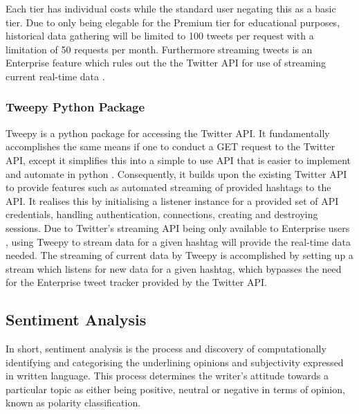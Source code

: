 \documentclass[oneside, 12pt]{article}
\begin{document}
			Each tier has individual costs while the standard user negating this as a basic tier. Due to only being elegable for the Premium tier for educational purposes, historical data gathering will be limited to 100 tweets per request with a limitation of 50 requests per month. Furthermore streaming tweets is an Enterprise feature which rules out the the Twitter API for use of streaming current real-time data \cite{ConStream}.
		
			\subsubsection{Tweepy Python Package}
			Tweepy is a python package for accessing the Twitter API. It fundamentally accomplishes the same means if one to conduct a GET request to the Twitter API, except it simplifies this into a simple to use API that is easier to implement and automate in python \cite{TweepyStream}. Consequently, it builds upon the existing Twitter API to provide features such as automated streaming of provided hashtags to the API. It realises this by initialising a listener instance for a provided set of API credentials, handling authentication, connections, creating and destroying sessions. Due to Twitter's streaming API being only available to Enterprise users \cite{SearchTweets}, using Tweepy to stream data for a given hashtag will provide the real-time data needed. The streaming of current data by Tweepy is accomplished by setting up a stream which listens for new data for a given hashtag, which bypasses the need for the Enterprise tweet tracker provided by the Twitter API.
			
		
		\subsection{Sentiment Analysis}\label{sentiment}
		In short, sentiment analysis is the process and discovery of computationally identifying and categorising the underlining opinions and subjectivity expressed in written language. This process determines the writer's attitude towards a particular topic as either being positive, neutral or negative in terms of opinion, known as polarity classification. 		
			
\end{document}
